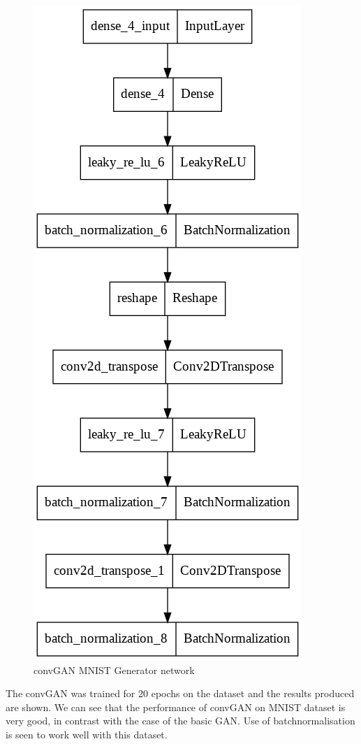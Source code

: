 \documentclass[conference]{IEEEtran}
\begin{document}
\begin{figure}[h]
\centering
\includegraphics[scale = 0.25]{convGAN_MNIST_gen_model.png}
  \caption{convGAN MNIST Generator network}
\end{figure}

The convGAN was trained for 20 epochs on the dataset and the results produced are shown. We can see that the performance of convGAN on MNIST dataset is very good, in contrast with the case of the basic GAN. Use of batchnormalisation is seen to work well with this dataset.\\
\end{document}
